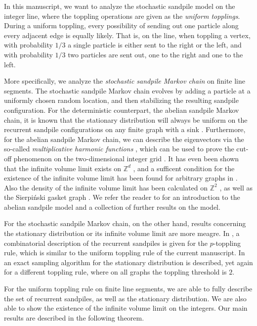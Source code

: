 \documentclass[11pt]{article}
\newcommand{\Z}{\mathbb{Z}}
\begin{document}
In this manuscript, we want to analyze the stochastic sandpile model on the integer line, where the toppling operations are given as the {\it uniform topplings}. During a uniform toppling, every possibility of sending out one particle along every adjacent edge is equally likely. That is, on the line, when toppling a vertex, with probability $1/3$ a single particle is either sent to the right or the left, and with probability $1/3$ two particles are sent out, one to the right and one to the left.

More specifically, we analyze the {\it stochastic sandpile Markov chain} on finite line segments. The stochastic sandpile Markov chain evolves by adding a particle at a uniformly chosen random location, and then stabilizing the resulting sandpile configuration. For the deterministic counterpart, the abelian sandpile Markov chain, it is known that the stationary distribution will always be uniform on the recurrent sandpile configurations on any finite graph with a sink \cite{D90,HLMP08}. Furthermore, for the abelian sandpile Markov chain, we can describe the eigenvectors via the so-called {\it multiplicative harmonic functions} \cite{JLP19}, which can be used to prove the cut-off phenomenon on the two-dimensional integer grid \cite{HJL19}. It has even been shown that the infinite volume limit exists on $\Z^d$ \cite{AJ04}, and a sufficent condition for the existence of the infinite volume limit has been found for arbitrary graphs in \cite{J12,JW14}. Also the density of the infinite volume limit has been calculated on $\Z^2$ \cite{P94,P10,P11,KW15,KW16}, as well as the Sierpi\'nski gasket graph \cite{HKS25}. We refer the reader to \cite{J18} for an introduction to the abelian sandpile model and a collection of further results on the model.

For the stochastic sandpile Markov chain, on the other hand, results concerning the stationary distribution or its infinite volume limit are more meagre. In \cite{ptoppling-CMS}, a combinatorial description of the recurrent sandpiles is given for the $p$-toppling rule, which is similar to the uniform toppling rule of the current manuscript. In \cite{CF25} an exact sampling algorithm for the stationary distribution is described, yet again for a different toppling rule, where on all graphs the toppling threshold is $2$.

For the uniform toppling rule on finite line segments, we are able to fully describe the set of recurrent sandpiles, as well as the stationary distribution. We are also able to show the existence of the infinite volume limit on the integers. Our main results are described in the following theorem.
\end{document}
